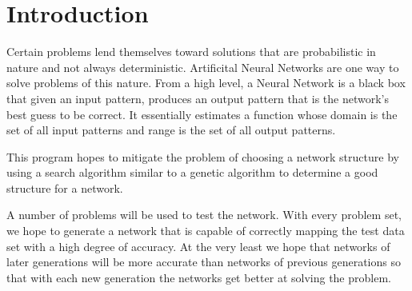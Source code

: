 \chapter[Introduction]{Introduction}
Certain problems lend themselves toward solutions that are probabilistic in nature and not always deterministic. 
Artificital Neural Networks are one way to solve problems of this nature. From a high level, a Neural Network is a black
box that given an input pattern, produces an output pattern that is the network's best guess to be correct. 
It essentially estimates a function whose domain is the set of all input patterns and range is the set of all output patterns.

This program hopes to mitigate the problem of choosing a network structure by using a search algorithm similar to a genetic algorithm to determine a good structure for a network. 

A number of problems will be used to test the network.  With every problem set, we hope to generate a network that is capable of correctly mapping the test data set with a high degree of accuracy.  At the very least we hope that networks of later generations will be more accurate than networks of previous generations so that with each new generation the networks get better at solving the problem.
